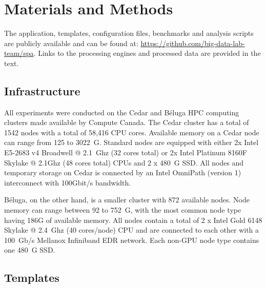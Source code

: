 \documentclass{IEEEtran}
\begin{document}
\section{Materials and Methods}\label{sec:methods}

    The application, templates, configuration files, benchmarks and analysis
    scripts are publicly available and can be found at:
    \href{https://github.com/big-data-lab-team/spa}{https://github.com/big-data-lab-team/spa}.
    Links to the processing engines and processed data are provided in the text.
    
    \subsection{Infrastructure}
    All experiments were conducted on the Cedar and B\'eluga HPC computing clusters
    made available by Compute Canada. The Cedar cluster has a total of 1542 nodes
    with a total of 58,416 CPU cores. Available memory on a Cedar node can range
    from 125 to 3022~G. Standard nodes are equipped with either 2x Intel E5-2683 v4
    Broadwell @ 2.1~Ghz (32 cores total) or 2x Intel Platinum 8160F Skylake @
    2.1Ghz (48 cores total) CPUs and 
    2 x 480~G SSD. All nodes and temporary storage on Cedar is connected by an 
    Intel OmniPath (version 1) interconnect with 100Gbit/s bandwidth.

    B\'eluga, on the other hand, is a smaller cluster with 872 available nodes. 
    Node memory can range between 92 to 752~G, with the most common node type having 
    186G of available memory. All nodes contain a total of 2 x Intel Gold 6148
    Skylake @ 2.4~Ghz (40 cores/node) CPU and are connected to each other with a
    100~Gb/s Mellanox Infiniband EDR network. Each non-GPU node type contains one 
    480~G SSD. 


    \subsection{Templates}
\end{document}
